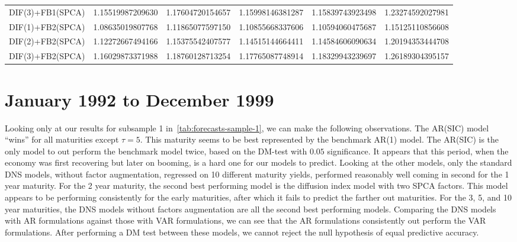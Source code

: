 \begin{table}[H]
\begin{adjustbox}{totalheight=\baselineskip}
\begin{tabular}{lSSSSS}
DIF(3)+FB1(SPCA) & 1.15519987209630 & 1.17604720154657 & 1.15998146381287 & 1.15839743923498 & 1.23274592027981 \\ 
DIF(1)+FB2(SPCA) & 1.08635019807768 & 1.11865077597150 & 1.10855668337606 & 1.10594060475687 & 1.15125110856608 \\ 
DIF(2)+FB2(SPCA) & 1.12272667494166 & 1.15375542407577 & 1.14515144664411 & 1.14584606090634 & 1.20194353444708 \\ 
DIF(3)+FB2(SPCA) & 1.16029873371988 & 1.18760128713254 & 1.17765087748914 & 1.18329943239697 & 1.26189304395157 \\ \bottomrule 
\end{tabular}
\end{adjustbox}
\end{table}

\section{January 1992 to December 1999}
Looking only at our results for subsample 1 in~\cref{tab:forecasts-sample-1}, we can make the following observations. 
The AR(SIC) model \enquote{wins} for all maturities except $\tau = 5$. 
This maturity seems to be best represented by the benchmark AR(1) model.
The AR(SIC) is the only model to out perform the benchmark model twice, based on the DM-test with $0.05$ significance. 
It appears that this period, when the economy was first recovering but later on booming, is a hard one for our models to predict. 
Looking at the other models, only the standard DNS models, without factor augmentation, regressed on 10 different maturity yields, performed reasonably well coming in second for the 1 year maturity. 
For the 2 year maturity, the second best performing model is the diffusion index model with two SPCA factors. 
This model appears to be performing consistently for the early maturities, after which it fails to predict the farther out maturities. 
For the 3, 5, and 10 year maturities, the DNS models without factors augmentation are all the second best performing models. 
Comparing the DNS models with AR formulations against those with VAR formulations, we can see that the AR formulations consistently out perform the VAR formulations. 
After performing a DM test between these models, we cannot reject the null hypothesis of equal predictive accuracy. 

